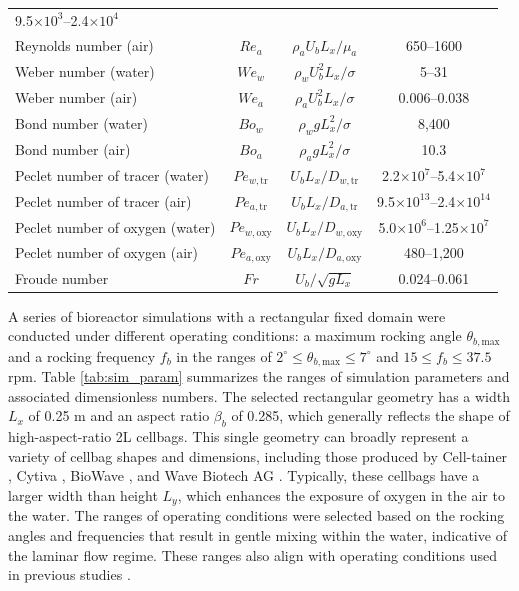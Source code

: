 \documentclass[final,3p,times,twocolumn,authoryear]{elsarticle}
\theoremstyle{definition}
\begin{document}
\begin{table}[h]
\begin{tabular}{m{15em} c c c}
9.5$\times 10^3$--2.4$\times 10^4$ \\
Reynolds number (air) & 
$Re_a$ & 
$\rho_a U_b L_x/\mu_a$ &
650--1600 \\
Weber number (water) & 
$We_w$ & 
$\rho_wU_b^2L_x/\sigma$ & 
5--31 \\
Weber number (air) & 
$We_a$ & 
$\rho_aU_b^2L_x/\sigma$ & 
0.006--0.038 \\
Bond number (water) & 
$Bo_w$ & 
$\rho_wgL_x^2/\sigma$ & 
8,400 \\
Bond number (air) & 
$Bo_a$ & 
$\rho_agL_x^2/\sigma$ & 
10.3 \\
Peclet number of tracer (water) & 
$Pe_{w,\textrm{tr}}$ & 
$U_bL_x/D_{w,\textrm{tr}}$ & 
2.2$\times 10^7$--5.4$\times 10^7$ \\
Peclet number of tracer (air) & 
$Pe_{a,\textrm{tr}}$ & 
$U_bL_x/D_{a,\textrm{tr}}$ & 
9.5$\times 10^{13}$--2.4$\times 10^{14}$  \\
Peclet number of oxygen (water) & 
$Pe_{w,\textrm{oxy}}$ & 
$U_bL_x/D_{w,\textrm{oxy}}$ & 
5.0$\times 10^6$--1.25$\times 10^7$ \\
Peclet number of oxygen (air) & 
$Pe_{a,\textrm{oxy}}$ & 
$U_bL_x/D_{a,\textrm{oxy}}$ & 
480--1,200 \\
Froude number & 
$Fr$ &
$U_b/\sqrt{gL_x}$& 
0.024--0.061 \\
\hline
\end{tabular}
\end{table}

A series of bioreactor simulations with a rectangular fixed domain were conducted under different operating conditions: a maximum rocking angle $\theta_{b,\textrm{max}}$ and a rocking frequency $f_b$ in the ranges of $2^{\circ} \leq\theta_{b,\textrm{max}}\leq 7^{\circ}$ and  $15 \leq f_b \leq 37.5$ rpm. Table \ref{tab:sim_param} summarizes the ranges of simulation parameters and associated dimensionless numbers. The selected rectangular geometry has a width $L_x$ of 0.25 m and an aspect ratio $\beta_b$ of 0.285, which generally reflects the shape of high-aspect-ratio 2L cellbags. This single geometry can broadly represent a variety of cellbag shapes and dimensions, including those produced by Cell-tainer \citep{Junne2013}, Cytiva \citep{Singh1999,Bartczak2022}, BioWave \citep{Eibl2010}, and Wave Biotech AG \citep{Oncul2010,Kalmbach2011}. Typically, these cellbags have a larger width than height $L_y$, which enhances the exposure of oxygen in the air to the water. The ranges of operating conditions were selected based on the rocking angles and frequencies that result in gentle mixing within the water, indicative of the laminar flow regime. These ranges also align with operating conditions used in previous studies \citep{Oncul2010,Kalmbach2011,Marsh2017}.
\end{document}
